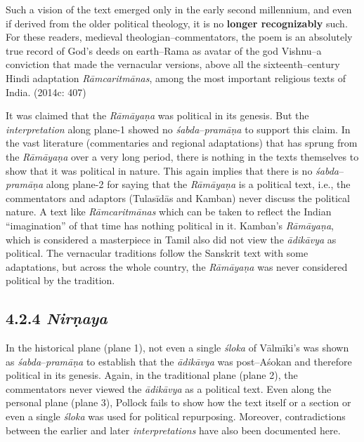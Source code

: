 \begin{myquote}
Such a vision of the text emerged only in the early second millennium, and even if derived from the older political theology, it is no \textbf{longer recognizably} such. For these readers, medieval theologian–commentators, the poem is an absolutely true record of God’s deeds on earth–Rama as avatar of the god Vishnu–a conviction that made the vernacular versions, above all the sixteenth–century Hindi adaptation \textit{Rāmcaritmānas}, among the most important religious texts of India. (2014c: 407)
\end{myquote}

It was claimed that the \textit{Rāmāyaṇa }was political in its genesis. But the \textit{interpretation} along plane-1 showed no \textit{śabda}–\textit{pramāṇa }to support this claim. In the vast literature (commentaries and regional adaptations) that has sprung from the \textit{Rāmāyaṇa }over a very long period, there is nothing in the texts themselves to show that it was political in nature. This again implies that there is no \textit{śabda}–\textit{pramāṇa} along plane-2 for saying that the \textit{Rāmāyaṇa }is a political text, i.e., the commentators and adaptors (Tulasīdās and Kamban) never discuss the political nature. A text like \textit{Rāmcaritmānas} which can be taken to reflect the Indian “imagination” of that time has nothing political in it. Kamban’s\textit{ Rāmāyaṇa}, which is considered a masterpiece in Tamil also did not view the \textit{ādikāvya }as political. The vernacular traditions follow the Sanskrit text with some adaptations, but across the whole country, the \textit{Rāmāyaṇa} was never considered political by the tradition.

\vspace{-.3cm}

\subsection*{4.2.4 {\it {\bfseries Nirṇaya}}}

In the historical plane (plane 1), not even a single \textit{śloka} of Vālmīki’s was shown as \textit{śabda}–\textit{pramāṇa} to establish that the \textit{ādikāvya }was post–Aśokan and therefore political in its genesis. Again, in the traditional plane (plane 2), the commentators never viewed the \textit{ādikāvya} as a political text. Even along the personal plane (plane 3), Pollock fails to show how the text itself or a section or even a single \textit{śloka} was used for political repurposing. Moreover, contradictions between the earlier and later \textit{interpretations} have also been documented here.

